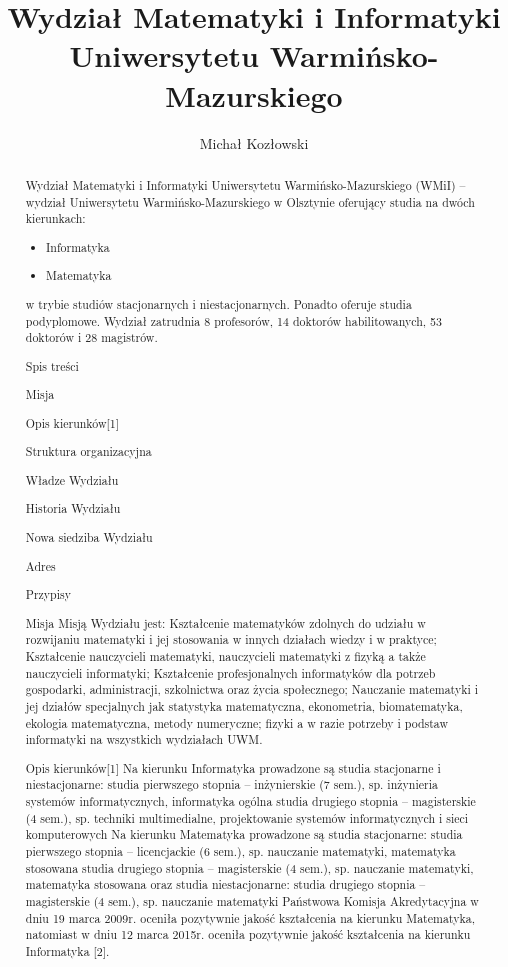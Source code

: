 ﻿\documentclass[a4paper,12pt]{article}
\title{Wydział Matematyki i Informatyki Uniwersytetu
Warmińsko-Mazurskiego}
\author{Michał Kozłowski}
\begin{document}
\maketitle

\begin{abstract}

Wydział Matematyki i Informatyki Uniwersytetu Warmińsko-Mazurskiego (WMiI) – wydział
Uniwersytetu Warmińsko-Mazurskiego w Olsztynie oferujący studia na dwóch kierunkach:
\begin{itemize}
\item Informatyka
\item Matematyka
\end{itemize}
w trybie studiów stacjonarnych i niestacjonarnych. Ponadto oferuje studia podyplomowe.
Wydział zatrudnia 8 profesorów, 14 doktorów habilitowanych, 53 doktorów i 28 magistrów.

Spis treści
\tableofcontents
\item Misja
\item Opis kierunków[1]
\item Struktura organizacyjna
\item Władze Wydziału
\item Historia Wydziału
\item Nowa siedziba Wydziału
\item Adres
\item Przypisy
\

Misja
Misją Wydziału jest:
Kształcenie matematyków zdolnych do udziału w rozwijaniu matematyki i jej stosowania w innych
działach wiedzy i w praktyce;
Kształcenie nauczycieli matematyki, nauczycieli matematyki z fizyką a także nauczycieli informatyki;
Kształcenie profesjonalnych informatyków dla potrzeb gospodarki, administracji, szkolnictwa oraz życia
społecznego;
Nauczanie matematyki i jej działów specjalnych jak statystyka matematyczna, ekonometria,
biomatematyka, ekologia matematyczna, metody numeryczne; fizyki a w razie potrzeby i podstaw
informatyki na wszystkich wydziałach UWM.

Opis kierunków[1]
Na kierunku Informatyka prowadzone są studia stacjonarne i niestacjonarne:
studia pierwszego stopnia – inżynierskie (7 sem.), sp. inżynieria systemów informatycznych, informatyka
ogólna
studia drugiego stopnia – magisterskie (4 sem.), sp. techniki multimedialne, projektowanie systemów
informatycznych i sieci komputerowych
Na kierunku Matematyka prowadzone są studia stacjonarne:
studia pierwszego stopnia – licencjackie (6 sem.), sp. nauczanie matematyki, matematyka stosowana
studia drugiego stopnia – magisterskie (4 sem.), sp. nauczanie matematyki, matematyka stosowana
oraz studia niestacjonarne:
studia drugiego stopnia – magisterskie (4 sem.), sp. nauczanie matematyki
Państwowa Komisja Akredytacyjna w dniu 19 marca 2009r. oceniła pozytywnie jakość kształcenia na kierunku
Matematyka, natomiast w dniu 12 marca 2015r. oceniła pozytywnie jakość kształcenia na kierunku
Informatyka [2].


\end{abstract}
\end{document}
